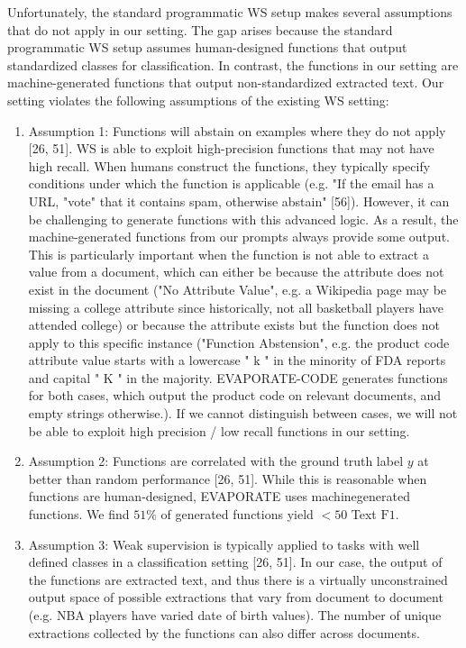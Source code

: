 \documentclass[10pt]{article}
\begin{document}
Unfortunately, the standard programmatic WS setup makes several assumptions that do not apply in our setting. The gap arises because the standard programmatic WS setup assumes human-designed functions that output standardized classes for classification. In contrast, the functions in our setting are machine-generated functions that output non-standardized extracted text. Our setting violates the following assumptions of the existing WS setting:

\begin{enumerate}
  \item Assumption 1: Functions will abstain on examples where they do not apply [26, 51]. WS is able to exploit high-precision functions that may not have high recall. When humans construct the functions, they typically specify conditions under which the function is applicable (e.g. "If the email has a URL, "vote" that it contains spam, otherwise abstain" [56]). However, it can be challenging to generate functions with this advanced logic. As a result, the machine-generated functions from our prompts always provide some output. This is particularly important when the function is not able to extract a value from a document, which can either be because the attribute does not exist in the document ("No Attribute Value", e.g. a Wikipedia page may be missing a college attribute since historically, not all basketball players have attended college) or because the attribute exists but the function does not apply to this specific instance ("Function Abstension", e.g. the product code attribute value starts with a lowercase " $\mathrm{k}$ " in the minority of FDA reports and capital " $\mathrm{K}$ " in the majority. EVAPORATE-CODE generates functions for both cases, which output the product code on relevant documents, and empty strings otherwise.). If we cannot distinguish between cases, we will not be able to exploit high precision / low recall functions in our setting.

  \item Assumption 2: Functions are correlated with the ground truth label $y$ at better than random performance [26, 51]. While this is reasonable when functions are human-designed, EVAPORATE uses machinegenerated functions. We find $51 \%$ of generated functions yield $<50$ Text $\mathrm{F} 1$.

  \item Assumption 3: Weak supervision is typically applied to tasks with well defined classes in a classification setting [26, 51]. In our case, the output of the functions are extracted text, and thus there is a virtually unconstrained output space of possible extractions that vary from document to document (e.g. NBA players have varied date of birth values). The number of unique extractions collected by the functions can also differ across documents.

\end{enumerate}
\end{document}
